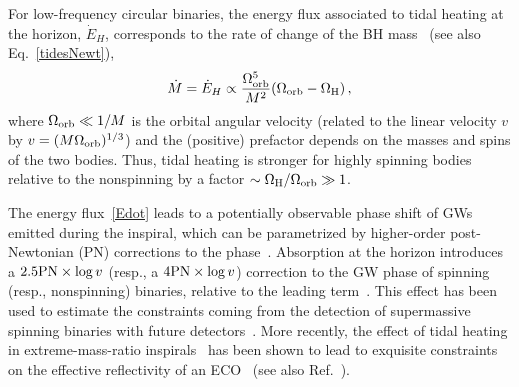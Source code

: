 \documentclass[11pt]{article}
\numberwithin{equation}{section} %
\begin{document}
For low-frequency circular binaries, the energy flux associated to tidal heating at the 
horizon, $\dot E_H$, corresponds to the rate of change of the BH 
mass~\cite{Alvi:2001mx,Poisson:2004cw} (see also Eq.~\eqref{tidesNewt}),
%
\begin{eqnarray}
 \dot M = \dot E_H \propto \frac{\Omega_{\rm orb}^5}{M^2}(\Omega_{\rm orb}-\Omega_{\rm H})\,, \label{Edot}
\end{eqnarray}
%
where $\Omega_{\rm orb}\ll 1/M$ is the orbital angular velocity (related to the linear velocity $v$ by $v=(M\Omega_{\rm 
orb})^{1/3}$) and the (positive) prefactor 
depends on the masses and spins of the two bodies. Thus, tidal heating is stronger for 
highly spinning bodies relative to the nonspinning by a factor $\sim \Omega_{\rm H}/\Omega_{\rm orb}\gg1$.


The energy flux~\eqref{Edot} leads to a potentially observable phase shift of GWs emitted 
during the inspiral, which can be parametrized by higher-order post-Newtonian (PN) corrections to the 
phase~\cite{Blanchet:2006zz}. Absorption at the horizon introduces a $2.5{\rm PN}\times\log v$ (resp., a $4{\rm 
PN}\times\log v$) correction to the GW phase of spinning (resp., nonspinning) binaries, relative to the leading 
term~\cite{Maselli:2017cmm}. This effect has been used to estimate the constraints coming from the detection of 
supermassive spinning binaries with future detectors~\cite{Maselli:2017cmm,Datta:2019euh}. More recently, the effect of 
tidal heating in extreme-mass-ratio inspirals~\cite{Hughes:2001jr} has been shown to lead to exquisite constraints on the effective 
reflectivity of an ECO~\cite{Datta:2019epe} (see also Ref.~\cite{Datta:2020rvo}).

\end{document}
